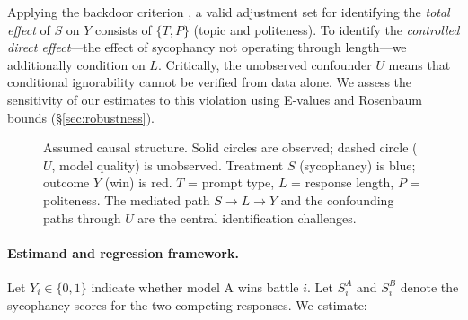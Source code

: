 \documentclass[11pt,twocolumn,a4paper]{article}
\begin{document}
Applying the backdoor criterion \citep{pearl2009causality}, a valid
adjustment set for identifying the \emph{total effect} of $S$ on $Y$
consists of $\{T, P\}$ (topic and politeness). To identify the
\emph{controlled direct effect}---the effect of sycophancy not
operating through length---we additionally condition on $L$.
Critically, the unobserved confounder $U$ means that conditional
ignorability cannot be verified from data alone. We assess the
sensitivity of our estimates to this violation using E-values
\citep{vanderweele2017sensitivity} and Rosenbaum bounds
(\S\ref{sec:robustness}).

\begin{figure}[t]
\centering
{}
\caption{Assumed causal structure. Solid circles are observed; dashed
circle ($U$, model quality) is unobserved. Treatment $S$ (sycophancy)
is blue; outcome $Y$ (win) is red. $T$ = prompt type, $L$ = response
length, $P$ = politeness. The mediated path $S \to L \to Y$ and the
confounding paths through $U$ are the central identification challenges.}
\label{fig:dag}
\end{figure}

\paragraph{Estimand and regression framework.}
Let $Y_i \in \{0, 1\}$ indicate whether model A wins battle $i$. Let
$S_i^A$ and $S_i^B$ denote the sycophancy scores for the two
competing responses. We estimate:
\end{document}
